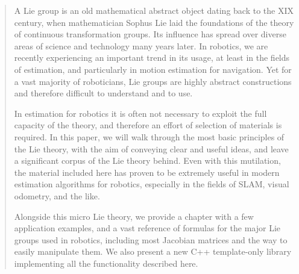 

\begin{abstract}

A Lie group is an old mathematical abstract object dating back to the XIX century, when mathematician Sophus Lie laid the foundations of the theory of continuous transformation groups. 
Its influence has spread over diverse areas of science and technology many years later. 
In robotics, we are recently experiencing an important trend in its usage, at least in the fields of estimation, and particularly in motion estimation for navigation. 
Yet for a vast majority of roboticians, Lie groups are highly abstract constructions and therefore difficult to understand and to use. 


In estimation for robotics it is often not necessary to exploit the full capacity of the theory, and therefore an effort of selection of materials is required. 
In this paper, we will walk through the most basic principles of the Lie theory, with the aim of conveying clear and useful ideas, and leave a significant corpus of the Lie theory behind. 
Even with this mutilation, the material included here has proven to be extremely useful in modern estimation algorithms for robotics, especially in the fields of SLAM, visual odometry, and the like. 

Alongside this micro Lie theory, we provide a chapter with a few application examples, and a vast reference of formulas for the major Lie groups used in robotics, including most Jacobian matrices and the way to easily manipulate them.
We also present a new C++ template-only library implementing all the functionality described here.



\end{abstract}
